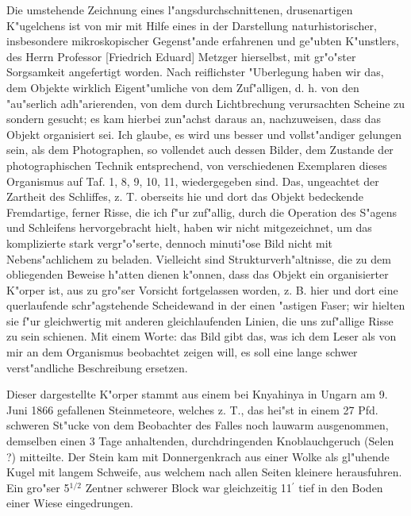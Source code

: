 \documentclass[a4paper, 11pt, oneside]{article}
\begin{document}
Die umstehende Zeichnung eines l"angsdurchschnittenen, drusenartigen K"ugelchens ist von mir mit Hilfe eines in der Darstellung naturhistorischer, insbesondere mikroskopischer Gegenst"ande erfahrenen und ge"ubten K"unstlers, des Herrn Professor [Friedrich Eduard] Metzger hierselbst, mit gr"o"ster Sorgsamkeit angefertigt worden. Nach reiflichster "Uberlegung haben wir das, dem Objekte wirklich Eigent"umliche von dem Zuf"alligen, d. h. von den "au"serlich adh"arierenden, von dem durch Lichtbrechung verursachten Scheine zu sondern gesucht; es kam hierbei zun"achst daraus an, nachzuweisen, dass das Objekt organisiert sei. Ich glaube, es wird uns besser und vollst"andiger gelungen sein, als dem Photographen, so vollendet auch dessen Bilder, dem Zustande der photographischen Technik entsprechend, von verschiedenen Exemplaren dieses Organismus auf Taf. 1, 8, 9, 10, 11, wiedergegeben sind. Das, ungeachtet der Zartheit des Schliffes, z. T. oberseits hie und dort das Objekt bedeckende Fremdartige, ferner Risse, die ich f"ur zuf"allig, durch die Operation des S"agens und Schleifens hervorgebracht hielt, haben wir nicht mitgezeichnet, um das komplizierte stark vergr"o"serte, dennoch minuti"ose Bild nicht mit Nebens"achlichem zu beladen. Vielleicht sind Strukturverh"altnisse, die zu dem obliegenden Beweise h"atten dienen k"onnen, dass das Objekt ein organisierter K"orper ist, aus zu gro"ser Vorsicht fortgelassen worden, z. B. hier und dort eine querlaufende schr"agstehende Scheidewand in der einen "astigen Faser; wir hielten sie f"ur gleichwertig mit anderen gleichlaufenden Linien, die uns zuf"allige Risse zu sein schienen. Mit einem Worte: das Bild gibt das, was ich dem Leser als von mir an dem Organismus beobachtet zeigen will, es soll eine lange schwer verst"andliche Beschreibung ersetzen.

Dieser dargestellte K"orper stammt aus einem bei Knyahinya in Ungarn am 9. Juni 1866 gefallenen Steinmeteore, welches z. T., das hei"st in einem 27 Pfd. schweren St"ucke von dem Beobachter des Falles noch lauwarm ausgenommen, demselben einen 3 Tage anhaltenden, durchdringenden Knoblauchgeruch (Selen ?) mitteilte. Der Stein kam mit Donnergenkrach aus einer Wolke als gl"uhende Kugel mit langem Schweife, aus welchem nach allen Seiten kleinere herausfuhren. Ein gro"ser 5$^{1/2}$ Zentner schwerer Block war gleichzeitig 11$^{\prime}$ tief in den Boden einer Wiese eingedrungen.
\end{document}
